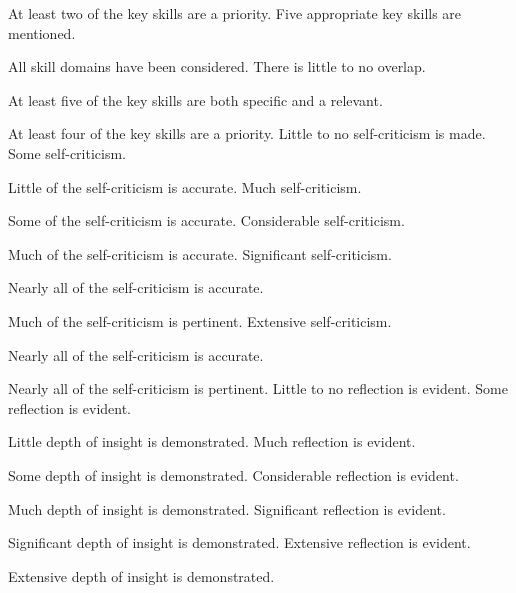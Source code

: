 \documentclass{../fal_assignment}
\begin{document}
\begin{markingrubric}
        \par 		At least two of the key skills are a priority.
        \grade 		Five appropriate key skills are mentioned.
        \par 		All skill domains have been considered. There is little to no overlap.
        \par 		At least five of the key skills are both specific and a relevant.
        \par 		At least four of the key skills are a priority.
%
        \grade \fail  	Little to no self-criticism is made.
        \grade 		Some self-criticism.
           \par 		Little of the self-criticism is accurate.
        \grade 		Much self-criticism.
         \par 		Some of the self-criticism is accurate.
        \grade 		Considerable self-criticism.
         \par 		Much of the self-criticism is accurate.
        \grade 		Significant self-criticism.
         \par 		Nearly all of the self-criticism is accurate.
            \par 		Much of the self-criticism is pertinent.
        \grade 		Extensive self-criticism.
         \par 		Nearly all of the self-criticism is accurate.
            \par 		Nearly all of the self-criticism is pertinent.
%
        \grade \fail 	Little to no reflection is evident.
        \grade 		Some reflection is evident.
        \par 		Little depth of insight is demonstrated.
        \grade 		Much reflection is evident.
        \par 		Some depth of insight is demonstrated.
        \grade 		Considerable reflection is evident.
        \par 		Much depth of insight is demonstrated.
        \grade 		Significant reflection is evident.
        \par 		Significant depth of insight is demonstrated.
        \grade 		Extensive reflection is evident.
        \par 		Extensive depth of insight is demonstrated.
%

\end{markingrubric}
\end{document}
